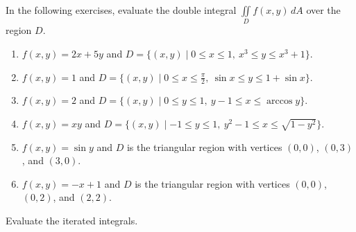\documentclass{exercises}
\begin{document}
In the following exercises, evaluate the double integral $\underset{D}{\iint}f(x,y)\,dA$ over the region $D$.

\begin{enumerate}[resume]
\item $f(x,y)=2x+5y$ and $D=\{(x,y)\mid 0\le x\le 1,\ x^{3}\le y\le x^{3}+1\}$.
\item $f(x,y)=1$ and $D=\{(x,y)\mid 0\le x\le \frac{\pi}{2},\ \sin x\le y\le 1+\sin x\}$.
\item $f(x,y)=2$ and $D=\{(x,y)\mid 0\le y\le 1,\ y-1\le x\le \arccos y\}$.
\item $f(x,y)=xy$ and $D=\{(x,y)\mid -1\le y\le 1,\ y^{2}-1\le x\le \sqrt{1-y^{2}}\}$.
\item $f(x,y)=\sin y$ and $D$ is the triangular region with vertices $(0,0)$, $(0,3)$, and $(3,0)$.
\item $f(x,y)=-x+1$ and $D$ is the triangular region with vertices $(0,0)$, $(0,2)$, and $(2,2)$.
\end{enumerate}

Evaluate the iterated integrals.
\end{document}
